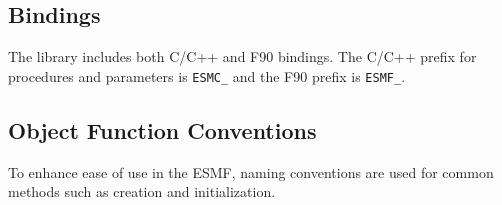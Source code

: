 
\subsection{Bindings}

The library includes both C/C++ and F90 bindings.  The C/C++ prefix
for procedures and parameters is {\tt ESMC\_} and the F90 prefix is
{\tt ESMF\_}.

\subsection{Object Function Conventions}

To enhance ease of use in the ESMF, naming conventions are
used for common methods such as creation and initialization.

